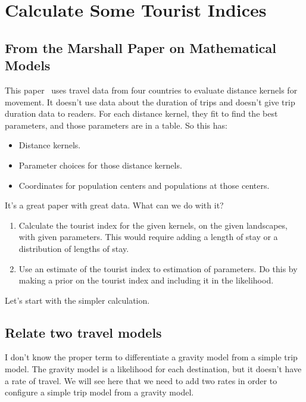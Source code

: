 \documentclass{article}
\begin{document}
\section{Calculate Some Tourist Indices}\label{sec:calculatetourist}

\subsection{From the Marshall Paper on Mathematical Models}

This paper~\cite{Marshall2018-wf} uses travel data from four countries to evaluate distance kernels for movement. It doesn't use data about the duration of trips and doesn't give trip duration data to readers. For each distance kernel, they fit to find the best parameters, and those parameters are in a table. So this has:
\begin{itemize}
  \item Distance kernels.
  \item Parameter choices for those distance kernels.
  \item Coordinates for population centers and populations at those centers.
\end{itemize}
It's a great paper with great data. What can we do with it?
\begin{enumerate}
  \item Calculate the tourist index for the given kernels, on the given landscapes, with given parameters. This would require adding a length of stay or a distribution of lengths of stay.

  \item Use an estimate of the tourist index to estimation of parameters. Do this by making a prior on the tourist index and including it in the likelihood.
\end{enumerate}
Let's start with the simpler calculation.

\subsection{Relate two travel models}

I don't know the proper term to differentiate a gravity model from a simple trip model. The gravity model is a likelihood for each destination, but it doesn't have a rate of travel. We will see here that we need to add two rates in order to configure a simple trip model from a gravity model.
\end{document}
